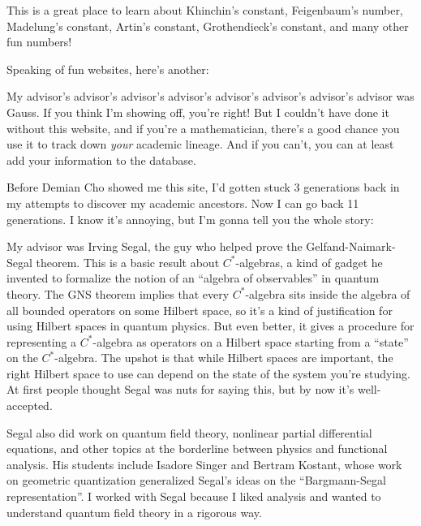 \documentclass{article}
\def\tightlist{}
\renewcommand{\texttt}[1]{%
  \begingroup
  \ttfamily
  \begingroup\lccode`~=`/\lowercase{\endgroup\def~}{/\discretionary{}{}{}}%
  \begingroup\lccode`~=`[\lowercase{\endgroup\def~}{[\discretionary{}{}{}}%
  \begingroup\lccode`~=`.\lowercase{\endgroup\def~}{.\discretionary{}{}{}}%
  \catcode`/=\active\catcode`[=\active\catcode`.=\active
  \scantokens{#1\noexpand}%
  \endgroup
}
\begin{document}
This is a great place to learn about Khinchin's constant, Feigenbaum's
number, Madelung's constant, Artin's constant, Grothendieck's constant,
and many other fun numbers!

Speaking of fun websites, here's another:


My advisor's advisor's advisor's advisor's advisor's advisor's advisor's
advisor was Gauss. If you think I'm showing off, you're right! But I
couldn't have done it without this website, and if you're a
mathematician, there's a good chance you use it to track down
\emph{your} academic lineage. And if you can't, you can at least add
your information to the database.

Before Demian Cho showed me this site, I'd gotten stuck 3 generations
back in my attempts to discover my academic ancestors. Now I can go back
11 generations. I know it's annoying, but I'm gonna tell you the whole
story:

My advisor was Irving Segal, the guy who helped prove the
Gelfand-Naimark-Segal theorem. This is a basic result about
\(C^*\)-algebras, a kind of gadget he invented to formalize the notion
of an ``algebra of observables'' in quantum theory. The GNS theorem
implies that every \(C^*\)-algebra sits inside the algebra of all
bounded operators on some Hilbert space, so it's a kind of justification
for using Hilbert spaces in quantum physics. But even better, it gives a
procedure for representing a \(C^*\)-algebra as operators on a Hilbert
space starting from a ``state'' on the \(C^*\)-algebra. The upshot is
that while Hilbert spaces are important, the right Hilbert space to use
can depend on the state of the system you're studying. At first people
thought Segal was nuts for saying this, but by now it's well-accepted.

Segal also did work on quantum field theory, nonlinear partial
differential equations, and other topics at the borderline between
physics and functional analysis. His students include Isadore Singer and
Bertram Kostant, whose work on geometric quantization generalized
Segal's ideas on the ``Bargmann-Segal representation''. I worked with
Segal because I liked analysis and wanted to understand quantum field
theory in a rigorous way.
\end{document}
